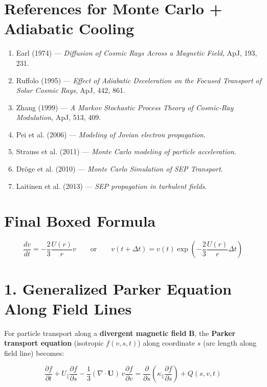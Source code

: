 \hrulefill

\section*{\texorpdfstring{ \textbf{References for Monte Carlo + Adiabatic Cooling}}{}}

\begin{enumerate}
    \item Earl (1974) --- \textit{Diffusion of Cosmic Rays Across a Magnetic Field}, ApJ, 193, 231.
    \item Ruffolo (1995) --- \textit{Effect of Adiabatic Deceleration on the Focused Transport of Solar Cosmic Rays}, ApJ, 442, 861.
    \item Zhang (1999) --- \textit{A Markov Stochastic Process Theory of Cosmic-Ray Modulation}, ApJ, 513, 409.
    \item Pei et al. (2006) --- \textit{Modeling of Jovian electron propagation}.
    \item Strauss et al. (2011) --- \textit{Monte Carlo modeling of particle acceleration}.
    \item Dröge et al. (2010) --- \textit{Monte Carlo Simulation of SEP Transport}.
    \item Laitinen et al. (2013) --- \textit{SEP propagation in turbulent fields}.
\end{enumerate}

\hrulefill

\section*{\texorpdfstring{ \textbf{Final Boxed Formula}}{}}

\[
\boxed{
\frac{dv}{dt} = -\frac{2}{3} \frac{U(r)}{r} v
}
\qquad \text{or} \qquad
\boxed{
v(t + \Delta t) = v(t) \exp\left( -\frac{2}{3} \frac{U(r)}{r} \Delta t \right)
}
\]


\section*{\texorpdfstring{ \textbf{1. Generalized Parker Equation Along Field Lines}}{}}

For particle transport along a \textbf{divergent magnetic field} $\mathbf{B}$, the \textbf{Parker transport equation} (isotropic $f(v, s, t)$) along coordinate $s$ (arc length along field line) becomes:

\begin{equation}
\frac{\partial f}{\partial t}
+ U_\parallel \frac{\partial f}{\partial s}
- \frac{1}{3} (\nabla \cdot \mathbf{U}) \, v \frac{\partial f}{\partial v}
= \frac{\partial}{\partial s} \left( \kappa_\parallel \frac{\partial f}{\partial s} \right) + Q(s, v, t)
\tag{1}
\end{equation}

